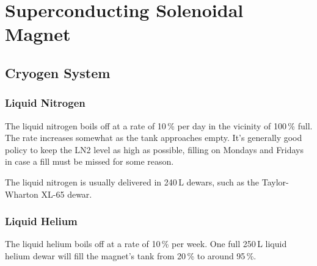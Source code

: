 
\section{Superconducting Solenoidal Magnet}
\label{sec:op_magnet}


\subsection{Cryogen System}
\label{sec:op_magnet:cryogens}

\subsubsection{Liquid Nitrogen}
\label{sec:op_magnet:cryogens:ln2}

The liquid nitrogen boils off at a rate of 10\,\% per day in the vicinity of 100\,\% full.  The rate increases somewhat as the tank approaches empty.  It's generally good policy to keep the LN2 level as high as possible, filling on Mondays and Fridays in case a fill must be missed for some reason.

The liquid nitrogen is usually delivered in 240\,L dewars, such as the Taylor-Wharton XL-65 dewar.

\subsubsection{Liquid Helium}
\label{sec:op_magnet:cryogens:lhe}

The liquid helium boils off at a rate of 10\,\% per week.  One full 250\,L liquid helium dewar will fill the magnet's tank from 20\,\% to around 95\,\%.  

